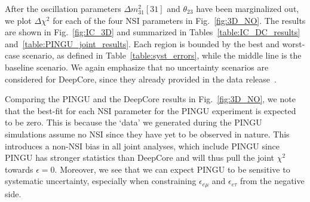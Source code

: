 \documentclass{article}
\newcommand{\eet}{\epsilon_{e\tau}}
\newcommand{\eem}{\epsilon_{e\mu}}
\newcommand{\dm}{\Delta m^2_{31}}
\begin{document}
{After the oscillation parameters $\dm[31]$ and $\theta_{23}$ have been marginalized out, we plot $\Delta \chi^2$ for each of the four NSI parameters in Fig.~\ref{fig:3D_NO}. 
The results are shown in Fig.~\ref{fig:IC_3D} and summarized in Tables~\ref{table:IC_DC_results} and~\ref{table:PINGU_joint_results}. Each region is bounded
by the best and worst-case scenario, as defined in Table~\ref{table:syst_errors}, while the middle line is the baseline scenario. We again emphasize that 
no uncertainty scenarios are considered for DeepCore, since they already provided in the data release~\cite{DC2019data}.

Comparing the PINGU and the DeepCore results in Fig.~\ref{fig:3D_NO}, we note that the best-fit for each NSI parameter for the PINGU experiment is expected to be zero. This is because the `data' we generated during 
the PINGU simulations assume no NSI since they have yet to be observed in nature. This introduces a non-NSI bias in all joint analyses, which include PINGU
since PINGU has stronger statistics than DeepCore and will thus pull the joint $\chi^2$ towards $\epsilon =0$.
Moreover, we see that we can expect PINGU to be sensitive to systematic uncertainty, especially when constraining $\eem$ and $\eet$ from the negative side.

}
\end{document}
